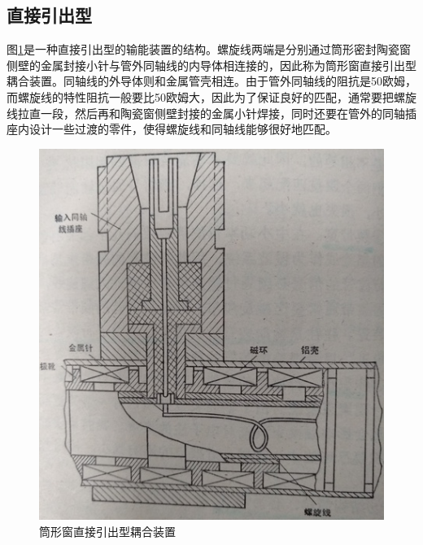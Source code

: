 \subsection{直接引出型}
图\ref{ch9-1}是一种直接引出型的输能装置的结构。螺旋线两端是分别通过筒形密封陶瓷窗侧壁的金属封接小针与管外同轴线的内导体相连接的，因此称为筒形窗直接引出型耦合装置。同轴线的外导体则和金属管壳相连。由于管外同轴线的阻抗是50欧姆，而螺旋线的特性阻抗一般要比50欧姆大，因此为了保证良好的匹配，通常要把螺旋线拉直一段，然后再和陶瓷窗侧壁封接的金属小针焊接，同时还要在管外的同轴插座内设计一些过渡的零件，使得螺旋线和同轴线能够很好地匹配。
\begin{figure}[phtb]
	\centering
	\includegraphics[width=0.75\linewidth]{figure/ch9-1}
	\caption{ 筒形窗直接引出型耦合装置}
	\label{ch9-1}
\end{figure}

